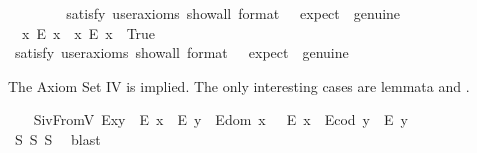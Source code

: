 \begin{isabellebody}
\ \ \isanewline
\ \ \ \ \isamarkupfalse%
\ {\isacharbrackleft}satisfy{\isacharcomma}\ user{\isacharunderscore}axioms{\isacharcomma}\ show{\isacharunderscore}all{\isacharcomma}\ format\ {\isacharequal}\ {}{\isacharcomma}\ expect\ {\isacharequal}\ genuine{\isacharbrackright}%
\isadelimproof
\ %
\endisadelimproof
%
\isatagproof
{}\isamarkupfalse%
%
\endisatagproof
{\isafoldproof}%
%
\isadelimproof
%
\endisadelimproof
\ \isanewline
\ \ \isamarkupfalse%
\ \ {\isachardoublequoteopen}{\isacharparenleft}{\isasymexists}x{\isachardot}\ \isactrlbold {\isasymnot}{\isacharparenleft}E\ x{\isacharparenright}{\isacharparenright}\ {\isasymand}\ {\isacharparenleft}{\isasymexists}x{\isachardot}\ {\isacharparenleft}E\ x{\isacharparenright}{\isacharparenright}{\isachardoublequoteclose}\ \ True\ \ %
\ \isanewline
\ \ \ \ \isamarkupfalse%
\ {\isacharbrackleft}satisfy{\isacharcomma}\ user{\isacharunderscore}axioms{\isacharcomma}\ show{\isacharunderscore}all{\isacharcomma}\ format\ {\isacharequal}\ {}{\isacharcomma}\ expect\ {\isacharequal}\ genuine{\isacharbrackright}%
\isadelimproof
\ %
\endisadelimproof
%
\isatagproof
{}\isamarkupfalse%
%
\endisatagproof
{\isafoldproof}%
%
\isadelimproof
%
\endisadelimproof
%
\begin{isamarkuptext}%
The Axiom Set IV is implied. The only interesting cases are 
 lemmata  and .%
\end{isamarkuptext}\isamarkuptrue%
\ \ \isamarkupfalse%
\ S\isactrlsub i\isactrlsub vFromV{\isacharcolon}\ {\isachardoublequoteopen}{\isacharparenleft}E{\isacharparenleft}x{\isasymcdot}y{\isacharparenright}\ \isactrlbold {\isasymrightarrow}\ {\isacharparenleft}E\ x\ \isactrlbold {\isasymand}\ E\ y{\isacharparenright}{\isacharparenright}\ \isactrlbold {\isasymand}\ {\isacharparenleft}E{\isacharparenleft}dom\ x\ {\isacharparenright}\ \isactrlbold {\isasymrightarrow}\ E\ x{\isacharparenright}\ \isactrlbold {\isasymand}\ {\isacharparenleft}E{\isacharparenleft}cod\ y{\isacharparenright}\ \isactrlbold {\isasymrightarrow}\ E\ y{\isacharparenright}{\isachardoublequoteclose}\ \ \ \isanewline
%
\isadelimproof
\ \ \ \ %
\endisadelimproof
%
\isatagproof
{}\isamarkupfalse%
\ S{}\ S{}\ S{}\ \isamarkupfalse%
\ blast%
\endisatagproof

\end{isabellebody}
